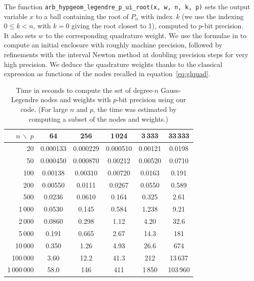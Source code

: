 \documentclass[nohypdvips,review]{siamart0216}
\begin{document}
The function
\texttt{arb\_hypgeom\_legendre\_p\_ui\_root(x, w, n, k, p)}
sets the output variable
$x$ to a ball containing the root of $P_n$ with index~$k$ (we use the indexing
$0 \le k < n$, with $k = 0$ giving the root closest to 1),
computed to $p$-bit precision.
It also sets $w$ to the corresponding quadrature weight.
We use the formulae in \cite[Theorem~1(c)]{petras1999computation} to
compute an initial enclosure with roughly machine precision,
followed by refinements with the interval Newton method
at doubling precision steps for very high precision.
We deduce the quadrature weights thanks to the classical expression as
functions of the nodes recalled in equation~\eqref{eq:glquad}.

\begin{table}[t!]
\caption{Time in seconds to compute the set of degree-$n$ Gauss-Legendre nodes and weights with $p$-bit precision
using our code.
(For large $n$ and $p$, the time was estimated by computing a subset of the nodes and weights.)}
\label{tab:timings}
\begin{center}
\begin{tabular}{ r | c c c c c }
$n\, \backslash \; p$ & 64 & 256 & 1\,024 & 3\,333 & 33\,333 \\
\hline\rule{0pt}{3ex}
20  & 0.000133  &  0.000229  &  0.000510  &  0.00121  &  0.0198  \\
50  & 0.000450  &  0.000870  &  0.00212  &  0.00520  &  0.0710  \\
100  & 0.00138  &  0.00310  &  0.00720  &  0.0163  &  0.191  \\
200  & 0.00550  &  0.0111  &  0.0267  &  0.0550  &  0.589  \\
500  & 0.0236  &  0.0610  &  0.164  &  0.325  &  2.61  \\
1\,000  & 0.0530  &  0.145  &  0.584  &  1.238  &  9.21  \\
2\,000  & 0.0860  &  0.298  &  1.12  &  4.20  &  32.6  \\
5\,000  & 0.191  &  0.665  &  2.67  &  14.3  &  181  \\
10\,000  & 0.350  &  1.26  &  4.93  &  26.6  &  674  \\
100\,000  & 3.60  &  12.2  &  41.3  &  212  &  13\,637  \\
1\,000\,000  & 58.0  &  146  &  411  &  1\,850  &  103\,960  \\
\end{tabular}
\end{center}
\end{table}
\end{document}
